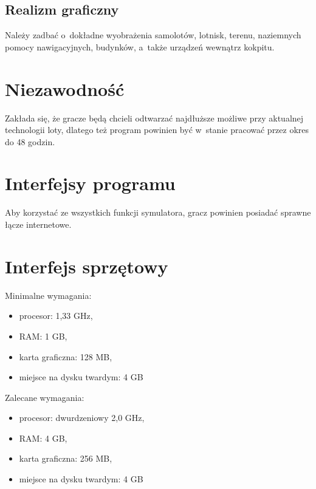 \documentclass{mwrep}
\begin{document}
\subsection{Realizm graficzny}
Należy zadbać o~dokładne wyobrażenia samolotów, lotnisk, terenu, naziemnych pomocy nawigacyjnych, budynków, a~także urządzeń wewnątrz kokpitu.

\section{Niezawodność}
Zakłada się, że gracze będą chcieli odtwarzać najdłuższe możliwe przy aktualnej technologii loty, dlatego też program powinien być w~stanie pracować przez okres do 48 godzin.

\section{Interfejsy programu}
Aby korzystać ze wszystkich funkcji symulatora, gracz powinien posiadać sprawne łącze internetowe.

\section{Interfejs sprzętowy}
Minimalne wymagania:
\begin{itemize}
\item procesor: 1,33 GHz,
\item RAM: 1 GB,
\item karta graficzna: 128 MB,
\item miejsce na dysku twardym: 4 GB
\end{itemize}
\vspace{1ex}
Zalecane wymagania:
\begin{itemize}
\item procesor: dwurdzeniowy 2,0 GHz,
\item RAM: 4 GB,
\item karta graficzna: 256 MB,
\item miejsce na dysku twardym: 4 GB
\end{itemize}
\end{document}
